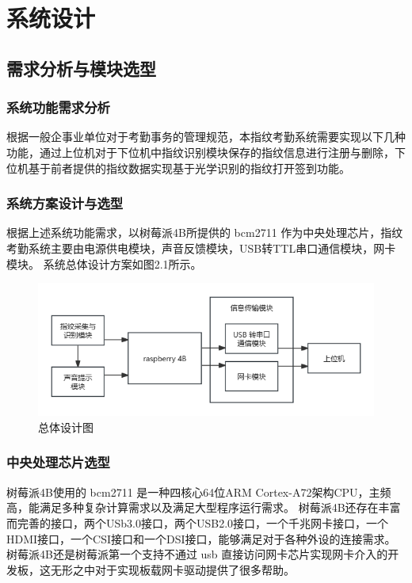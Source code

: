 \section{系统设计}

\subsection{需求分析与模块选型}

\subsubsection{系统功能需求分析}

根据一般企事业单位对于考勤事务的管理规范，本指纹考勤系统需要实现以下几种功能，通过上位机对于下位机中指纹识别模块保存的指纹信息进行注册与删除，下位机基于前者提供的指纹数据实现基于光学识别的指纹打开签到功能。

\subsubsection{系统方案设计与选型}

根据上述系统功能需求，以树莓派4B所提供的 bcm2711 作为中央处理芯片，指纹考勤系统主要由电源供电模块，声音反馈模块，USB转TTL串口通信模块，网卡模块。
系统总体设计方案如图2.1所示。

\begin{figure}[ht]
    \centering
    \includegraphics[width=\textwidth]{imgs/总体设计图.png}
    \caption{总体设计图}    \label{overall_design}
\end{figure}

\subsubsection{中央处理芯片选型}

树莓派4B使用的 bcm2711 是一种四核心64位ARM Cortex-A72架构CPU，主频高，能满足多种复杂计算需求以及满足大型程序运行需求。
树莓派4B还存在丰富而完善的接口，两个USb3.0接口，两个USB2.0接口，一个千兆网卡接口，一个HDMI接口，一个CSI接口和一个DSI接口，能够满足对于各种外设的连接需求。
树莓派4B还是树莓派第一个支持不通过 usb 直接访问网卡芯片实现网卡介入的开发板，这无形之中对于实现板载网卡驱动提供了很多帮助。

